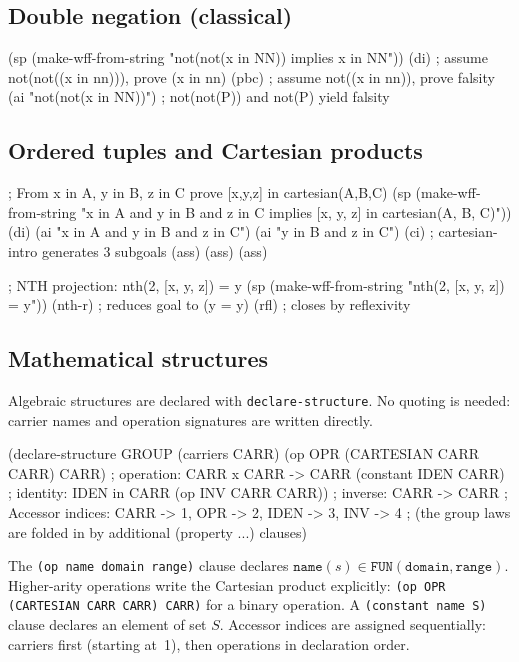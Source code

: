 \subsection{Double negation (classical)}

\begin{VNBcode}
(sp (make-wff-from-string "not(not(x in NN)) implies x in NN"))
(di)                              ; assume not(not((x in nn))), prove (x in nn)
(pbc)                             ; assume not((x in nn)), prove falsity
(ai "not(not(x in NN))")         ; not(not(P)) and not(P) yield falsity
\end{VNBcode}

\subsection{Ordered tuples and Cartesian products}

\begin{VNBcode}
; From x in A, y in B, z in C prove [x,y,z] in cartesian(A,B,C)
(sp (make-wff-from-string
      "x in A and y in B and z in C implies [x, y, z] in cartesian(A, B, C)"))
(di)
(ai "x in A and y in B and z in C")
(ai "y in B and z in C")
(ci)              ; cartesian-intro generates 3 subgoals
(ass) (ass) (ass)

; NTH projection: nth(2, [x, y, z]) = y
(sp (make-wff-from-string "nth(2, [x, y, z]) = y"))
(nth-r)           ; reduces goal to (y = y)
(rfl)             ; closes by reflexivity
\end{VNBcode}

\subsection{Mathematical structures}

Algebraic structures are declared with \texttt{declare-structure}.
No quoting is needed: carrier names and operation signatures are written
directly.

\begin{VNBcode}
(declare-structure GROUP
  (carriers CARR)
  (op OPR (CARTESIAN CARR CARR) CARR)  ; operation: CARR x CARR -> CARR
  (constant IDEN CARR)                 ; identity: IDEN in CARR
  (op INV CARR CARR))                  ; inverse: CARR -> CARR
; Accessor indices: CARR -> 1, OPR -> 2, IDEN -> 3, INV -> 4
; (the group laws are folded in by additional (property ...) clauses)
\end{VNBcode}

\begin{sloppypar}The \texttt{(op name domain range)} clause declares
$\texttt{name}(s) \in \texttt{FUN}(\texttt{domain}, \texttt{range})$.
Higher-arity operations write the Cartesian product explicitly:
\texttt{(op OPR (CARTESIAN CARR CARR) CARR)} for a binary operation.
A \texttt{(constant name S)} clause declares an element of set $S$.
Accessor indices are assigned sequentially: carriers first (starting
at~1), then operations in declaration order.\end{sloppypar}

